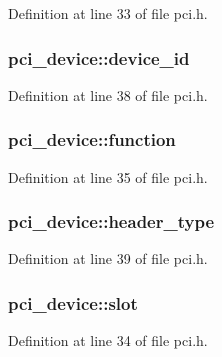 Definition at line 33 of file pci.h.

\hypertarget{structpci__device_acf4ab6914e188079b69a114b8435b0b5}{
\subsubsection[{device\_\-id}]{ {\bf pci\_\-device::device\_\-id}}}
\label{structpci__device_acf4ab6914e188079b69a114b8435b0b5}


Definition at line 38 of file pci.h.

\hypertarget{structpci__device_aa3a62446ea5e91d9d17f9200a14e7330}{
\subsubsection[{function}]{ {\bf pci\_\-device::function}}}
\label{structpci__device_aa3a62446ea5e91d9d17f9200a14e7330}


Definition at line 35 of file pci.h.

\hypertarget{structpci__device_aa073d9d89b4ab12691bdef015834b17a}{
\subsubsection[{header\_\-type}]{ {\bf pci\_\-device::header\_\-type}}}
\label{structpci__device_aa073d9d89b4ab12691bdef015834b17a}


Definition at line 39 of file pci.h.

\hypertarget{structpci__device_a3b130ee93599464c3ef8512cb2a77097}{
\subsubsection[{slot}]{ {\bf pci\_\-device::slot}}}
\label{structpci__device_a3b130ee93599464c3ef8512cb2a77097}


Definition at line 34 of file pci.h.


